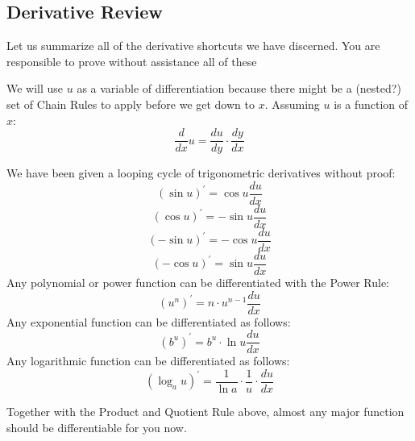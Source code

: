 \subsection{Derivative Review}
Let us summarize all of the derivative shortcuts we have discerned.  You are 
responsible to prove without assistance all of these

We will use $u$ as a variable of differentiation because there might be a
(nested?) set of Chain Rules to apply before we get down to $x$.  Assuming
$u$ is a function of $x$:
\begin{equation}
\frac{d}{dx}u = \frac{du}{dy}\cdot{}\frac{dy}{dx}
\end{equation}

We have been given a looping cycle of trigonometric derivatives without proof:
\begin{equation}
\left(\sin{u}\right)^\prime = \cos{u}\frac{du}{dx}
\end{equation}
\begin{equation}
\left(\cos{u}\right)^\prime = -\sin{u}\frac{du}{dx}
\end{equation}
\begin{equation}
\left(-\sin{u}\right)^\prime = -\cos{u}\frac{du}{dx}
\end{equation}
\begin{equation}
\left(-\cos{u}\right)^\prime = \sin{u}\frac{du}{dx}
\end{equation}
Any polynomial or power function can be differentiated with the Power Rule:
\begin{equation}
\left(u^n\right)^\prime = n\cdot{}u^{n-1}\frac{du}{dx}
\end{equation}
Any exponential function can be differentiated as follows:
\begin{equation}
(b^u)^\prime = b^u\cdot{}\ln{u}\frac{du}{dx}
\end{equation}
Any logarithmic function can be differentiated as follows:
\begin{equation}
\left(\log_a{u}\right)^\prime = \frac{1}{\ln{a}}\cdot{}\frac{1}{u}\cdot{}\frac{du}{dx}
\end{equation}

Together with the Product and Quotient Rule above, almost any major
function should be differentiable for you now.



